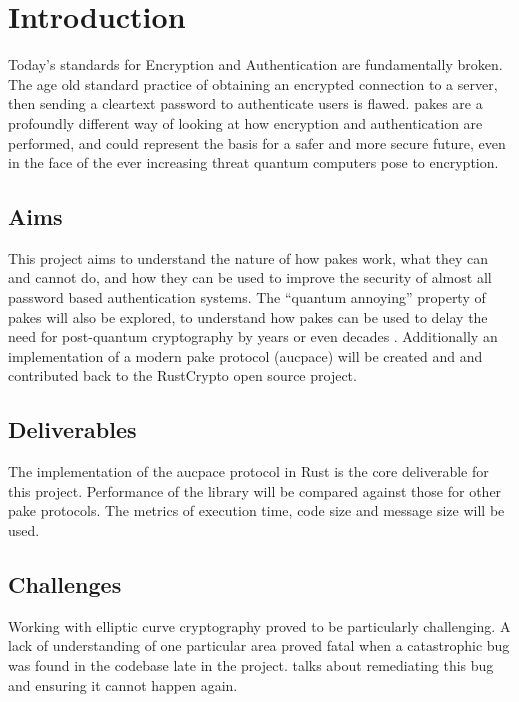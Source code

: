 \chapter{Introduction}
\label{chap:intro}

Today's standards for Encryption and Authentication are fundamentally broken.
The age old standard practice of obtaining an encrypted connection to a server, then sending a cleartext password to authenticate users is flawed.
\glspl{pake} are a profoundly different way of looking at how encryption and authentication are performed, and could represent the basis for a safer and more secure future, even in the face of the ever increasing threat quantum computers pose to encryption.

\section{Aims}
This project aims to understand the nature of how \glspl{pake} work, what they can and cannot do, and how they can be used to improve the security of almost all password based authentication systems.
The \enquote{quantum annoying} property of \glspl{pake} will also be explored, to understand how \glspl{pake} can be used to delay the need for post-quantum cryptography by years or even decades \cite{quantum-annoying}.
Additionally an implementation of a modern \gls{pake} protocol (\gls{aucpace}) will be created and and contributed back to the RustCrypto open source project.

\section{Deliverables}
The implementation of the \gls{aucpace} protocol in Rust is the core deliverable for this project.
Performance of the library will be compared against those for other \gls{pake} protocols.
The metrics of execution time, code size and message size will be used.

\section{Challenges}
Working with elliptic curve cryptography proved to be particularly challenging.
A lack of understanding of one particular area proved fatal when a catastrophic bug was found in the codebase late in the project.
 talks about remediating this bug and ensuring it cannot happen again.

